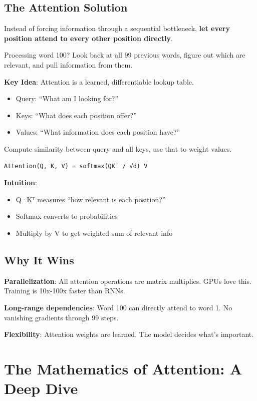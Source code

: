 \documentclass[11pt,oneside]{book}
\begin{document}
\subsection{The Attention Solution}

Instead of forcing information through a sequential bottleneck, \textbf{let every position attend to every other position directly}.

Processing word 100? Look back at all 99 previous words, figure out which are relevant, and pull information from them.

\textbf{Key Idea}: Attention is a learned, differentiable lookup table.

\begin{itemize}
\item Query: ``What am I looking for?''
\item Keys: ``What does each position offer?''
\item Values: ``What information does each position have?''
\end{itemize}

Compute similarity between query and all keys, use that to weight values.

\begin{verbatim}
Attention(Q, K, V) = softmax(QKᵀ / √d) V
\end{verbatim}

\textbf{Intuition}:
\begin{itemize}
\item Q·Kᵀ measures ``how relevant is each position?''
\item Softmax converts to probabilities
\item Multiply by V to get weighted sum of relevant info
\end{itemize}

\subsection{Why It Wins}

\textbf{Parallelization}: All attention operations are matrix multiplies. GPUs love this. Training is 10x-100x faster than RNNs.

\textbf{Long-range dependencies}: Word 100 can directly attend to word 1. No vanishing gradients through 99 steps.

\textbf{Flexibility}: Attention weights are learned. The model decides what's important.

\section{The Mathematics of Attention: A Deep Dive}
\end{document}
